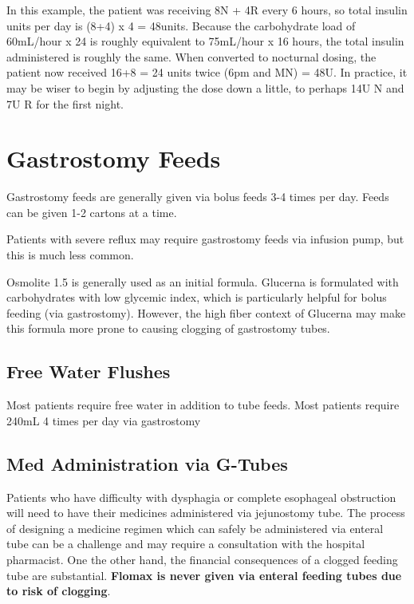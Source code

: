 \documentclass[
]{book}
\begin{document}
In this example, the patient was receiving 8N + 4R every 6 hours, so total insulin units per day is (8+4) x 4 = 48units. Because the carbohydrate load of 60mL/hour x 24 is roughly equivalent to 75mL/hour x 16 hours, the total insulin administered is roughly the same. When converted to nocturnal dosing, the patient now received 16+8 = 24 units twice (6pm and MN) = 48U. In practice, it may be wiser to begin by adjusting the dose down a little, to perhaps 14U N and 7U R for the first night.

\hypertarget{gastrostomy-feeds}{%
\chapter{Gastrostomy Feeds}\label{gastrostomy-feeds}}

Gastrostomy feeds are generally given via bolus feeds 3-4 times per day. Feeds can be given 1-2 cartons at a time.

Patients with severe reflux may require gastrostomy feeds via infusion pump, but this is much less common.

Osmolite 1.5 is generally used as an initial formula. Glucerna is formulated with carbohydrates with low glycemic index, which is particularly helpful for bolus feeding (via gastrostomy). However, the high fiber context of Glucerna may make this formula more prone to causing clogging of gastrostomy tubes.

\hypertarget{free-water-flushes}{%
\section{Free Water Flushes}\label{free-water-flushes}}

Most patients require free water in addition to tube feeds. Most patients require 240mL 4 times per day via gastrostomy

\hypertarget{med-administration-via-g-tubes}{%
\section{Med Administration via G-Tubes}\label{med-administration-via-g-tubes}}

Patients who have difficulty with dysphagia or complete esophageal obstruction will need to have their medicines administered via jejunostomy tube. The process of designing a medicine regimen which can safely be administered via enteral tube can be a challenge and may require a consultation with the hospital pharmacist. One the other hand, the financial consequences of a clogged feeding tube are substantial. \textbf{Flomax is never given via enteral feeding tubes due to risk of clogging}.
\end{document}
